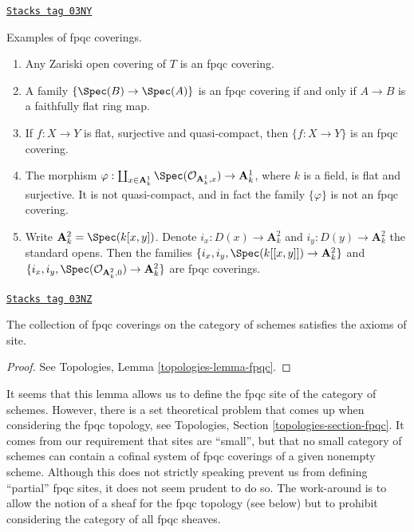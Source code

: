 \begin{example}
\label{etale-cohomology-example-fpqc-coverings}
\href{https://stacks.math.columbia.edu/tag/03NY}{\texttt{Stacks tag 03NY}}

Examples of fpqc coverings.
\begin{enumerate}
\item Any Zariski open covering of $T$ is an fpqc covering.
\item A family $\{\Spec(B) \to \Spec(A)\}$ is an fpqc
covering if and only if $A \to B$ is a faithfully flat ring map.
\item If $f: X \to Y$ is flat, surjective and quasi-compact, then $\{ f: X\to
Y\}$ is an fpqc covering.
\item The morphism
$\varphi :
\coprod_{x \in \mathbf{A}^1_k} \Spec(\mathcal{O}_{\mathbf{A}^1_k, x})
\to \mathbf{A}^1_k$,
where $k$ is a field, is flat and surjective. It is not quasi-compact, and
in fact the family $\{\varphi\}$ is not an fpqc covering.
\item Write
$\mathbf{A}^2_k = \Spec(k[x, y])$. Denote $i_x : D(x) \to \mathbf{A}^2_k$
and $i_y : D(y) \to \mathbf{A}^2_k$ the standard opens.
Then the families
$\{i_x, i_y, \Spec(k[[x, y]]) \to \mathbf{A}^2_k\}$
and
$\{i_x, i_y, \Spec(\mathcal{O}_{\mathbf{A}^2_k, 0}) \to \mathbf{A}^2_k\}$
are fpqc coverings.
\end{enumerate}
\end{example}

\begin{lemma}
\label{etale-cohomology-lemma-site-fpqc}
\href{https://stacks.math.columbia.edu/tag/03NZ}{\texttt{Stacks tag 03NZ}}

The collection of fpqc coverings on the category of schemes
satisfies the axioms of site.
\end{lemma}

\begin{proof}
See Topologies, Lemma \ref{topologies-lemma-fpqc}.
\end{proof}

It seems that this lemma allows us to define the fpqc site of the category
of schemes. However, there is a set theoretical problem that comes up when
considering the fpqc topology, see
Topologies, Section \ref{topologies-section-fpqc}.
It comes from our requirement that sites are ``small'', but that no small
category of schemes can contain a cofinal system of fpqc coverings of a
given nonempty scheme. Although this does not strictly speaking prevent
us from defining  ``partial'' fpqc
sites, it does not seem prudent to do so. The work-around is to allow
the notion of a sheaf for the fpqc topology (see below) but to prohibit
considering the category of all fpqc sheaves.

